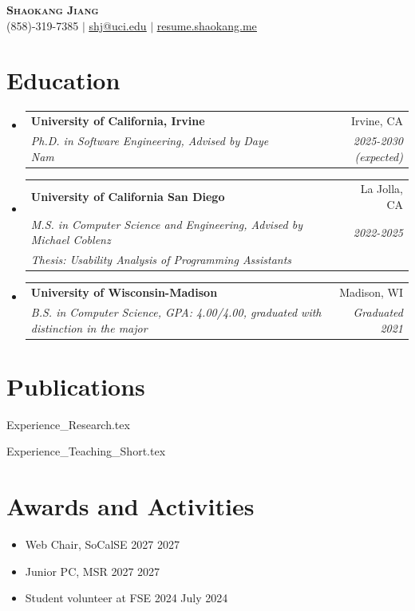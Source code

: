 \documentclass[letterpaper,11pt]{article}
\makeatletter
\newcommand{\resumeItem}[1]{
  \item\small{
    {#1 \vspace{-2pt}}
  }
}
\newcommand{\resumeSubheading}[4]{
  \Needspace{5\baselineskip}
  \vspace{-2pt}\item
    \begin{tabular*}{0.97\textwidth}[t]{l@{\extracolsep{\fill}}r}
      \textbf{#1} & #2 \\
      \textit{\small#3} & \textit{\small #4} \\
    \end{tabular*}\vspace{-7pt}
}
\newcommand{\resumeSubheadingtwo}[6]{
  \vspace{-2pt}\item
    \begin{tabular*}{0.97\textwidth}[t]{l@{\extracolsep{\fill}}r}
      \textbf{#1} & #2 \\
      \textit{\small #3} & \textit{\small #4} \\
      \textit{\small #5} & \textit{\small #6} \\
    \end{tabular*}\vspace{-7pt}
}
\newcommand{\resumeSubHeadingListStart}{\begin{itemize}[leftmargin=0.12in, label={}]}
\newcommand{\resumeSubHeadingListEnd}{\end{itemize}}
\newcommand{\resumeItemListStart}{\begin{itemize}}
\newcommand{\resumeItemListEnd}{\end{itemize}\vspace{0pt}}
\makeatother
\begin{document}

\begin{center}
    \textbf{\Huge \scshape Shaokang Jiang} \\ \vspace{1pt}
    \small (858)-319-7385 $|$ \href{mailto:shj@uci.edu}{\underline{shj@uci.edu}} $|$ 
    \href{https://resume.shaokang.me/}{\underline{resume.shaokang.me}}
\end{center}


\section{Education}
  \resumeSubHeadingListStart
      \resumeSubheading
      {University of California, Irvine}{Irvine, CA}
      {Ph.D. in Software Engineering, Advised by Daye Nam}{2025-2030 (expected)}
    \resumeSubheadingtwo
      {University of California San Diego}{La Jolla, CA}
      {M.S. in Computer Science and Engineering, Advised by Michael Coblenz}{2022-2025}
      {Thesis: Usability Analysis of Programming Assistants}{}
      \resumeSubheading
      {University of Wisconsin-Madison}{Madison, WI}
      {B.S. in Computer Science, GPA: 4.00/4.00, graduated with distinction in the major}{Graduated 2021}
  \resumeSubHeadingListEnd


  
\section{Publications}
\nocite{*}
\hspace*{8pt}\begin{minipage}{\dimexpr\textwidth-8pt\relax}
\printbibliography[heading=none,check=researchPublications]
\end{minipage}

{Experience_Research.tex}

{Experience_Teaching_Short.tex}

\section{Awards and Activities}

\resumeItemListStart
\resumeItem{Web Chair, SoCalSE 2027 \hfill 2027}
\resumeItem{Junior PC, MSR 2027 \hfill 2027}
\resumeItem{Student volunteer at FSE 2024 \hfill July 2024}
\resumeItemListEnd


\end{document}
